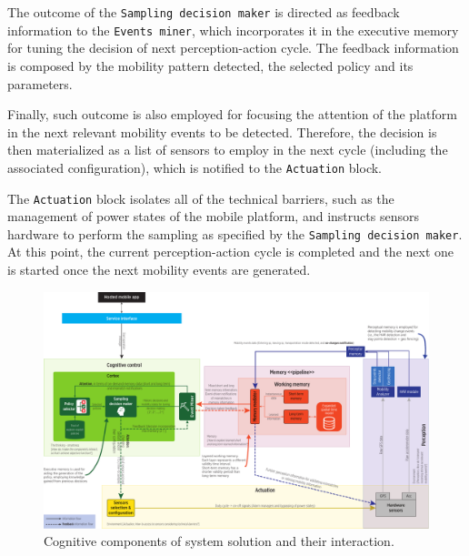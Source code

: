 \documentclass[ENG,PhD]{cinvestav}
\begin{document}
The outcome of the \texttt{Sampling decision maker} is directed as feedback information to the \texttt{Events miner}, which incorporates it in the executive memory for tuning the decision of next perception-action cycle.
The feedback information is composed by the mobility pattern detected, the selected policy and its parameters.

Finally, such outcome is also employed for focusing the attention of the platform in the next relevant mobility events to be detected.
Therefore, the decision is then materialized as a list of sensors to employ in the next cycle (including the associated configuration), which is notified to the \texttt{Actuation} block.

The \texttt{Actuation} block isolates all of the technical barriers, such as the management of power states of the mobile platform, and instructs sensors hardware to perform the sampling as specified by the \texttt{Sampling decision maker}.
At this point, the current perception-action cycle is completed and the next one is started once the next mobility events are generated.

\begin{landscape}
\begin{figure}
  \centering
  \includegraphics[width=\linewidth]{vectors/smartness-components-v4}
  \caption{Cognitive components of system solution and their interaction.}
  \label{fig:smartness-components}
\end{figure}
\end{landscape}
\end{document}
